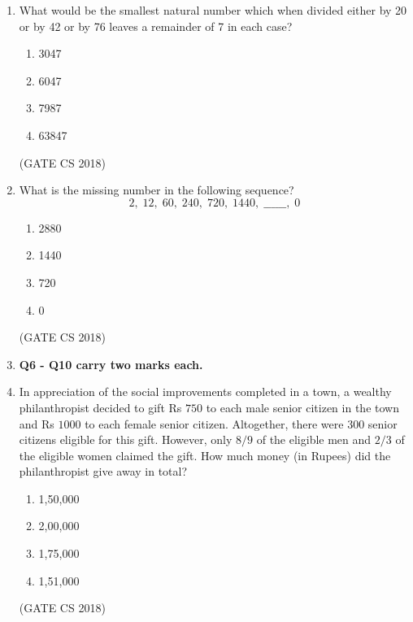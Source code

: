 \documentclass[12pt]{article}
\begin{document}
\begin{enumerate}
(GATE CS 2018)

\item What would be the smallest natural number which when divided either by 20 or by 42 or by 76 leaves a remainder of 7 in each case?

\begin{multicols}{4}
\begin{enumerate}
\item 3047
\item 6047
\item 7987
\item 63847
\end{enumerate}
\end{multicols}

(GATE CS 2018)

\item What is the missing number in the following sequence?
$$
2,\;12,\;60,\;240,\;720,\;1440,\;\_\_\_\_\_\_,\;0
$$

\begin{multicols}{4}
\begin{enumerate}
\item 2880
\item 1440
\item 720
\item 0
\end{enumerate}
\end{multicols}

(GATE CS 2018)

\item[] \textbf{Q6 - Q10 carry two marks each.}

\item In appreciation of the social improvements completed in a town, a wealthy philanthropist decided to gift Rs $750$ to each male senior citizen in the town and Rs $1000$ to each female senior citizen. Altogether, there were $300$ senior citizens eligible for this gift. However, only $8/9$ of the eligible men and $2/3$ of the eligible women claimed the gift. How much money (in Rupees) did the philanthropist give away in total?

\begin{multicols}{2}
\begin{enumerate}
\item 1,50,000
\item 2,00,000
\item 1,75,000
\item 1,51,000
\end{enumerate}
\end{multicols}
(GATE CS 2018)


\end{enumerate}
\end{document}
